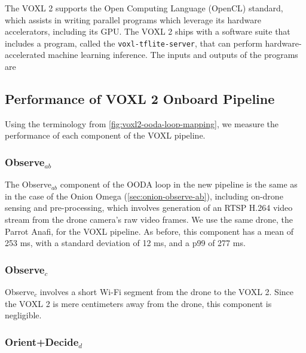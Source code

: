 The VOXL 2 supports the Open Computing Language (OpenCL) standard, which
assists in writing parallel programs which leverage its hardware accelerators,
including its GPU. The VOXL 2 ships with a software suite that includes a
program, called the \texttt{voxl-tflite-server}, that can perform
hardware-accelerated machine learning inference. The inputs and outputs of the
programs are


\subsection{Performance of VOXL 2 Onboard Pipeline}

Using the terminology from \cref{fig:voxl2-ooda-loop-mapping}, we measure the
performance of each component of the VOXL pipeline.

\subsubsection*{Observe$_{ab}$}

The Observe$_{ab}$ component of the OODA loop in the new pipeline is the same as in
the case of the Onion Omega (\cref{sec:onion-observe-ab}), including on-drone
sensing and pre-processing, which involves generation of an RTSP H.264 video
stream from the drone camera's raw video frames. We use the same drone,
the Parrot Anafi, for the VOXL pipeline. As before, this component has a mean
of 253 ms, with a standard deviation of 12 ms, and a p99 of 277 ms.

\subsubsection*{Observe$_{c}$}

Observe$_c$ involves a short Wi-Fi segment from the drone to the VOXL 2. Since
the VOXL 2 is mere centimeters away from the drone, this component is
negligible.

\subsubsection*{Orient+Decide$_{d}$}

